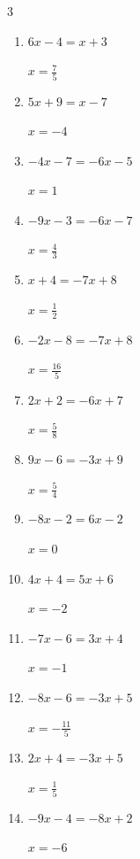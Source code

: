 \begin{multicols}{3}
\begin{enumerate}
        $\displaystyle x=\frac{5}{2}$

  \item $6x-4=x+3$

        $\displaystyle x=\frac{7}{5}$

  \item $5x+9=x-7$

        $\displaystyle x=-4$

  \item $-4x-7=-6x-5$

        $\displaystyle x=1$

  \item $-9x-3=-6x-7$

        $\displaystyle x=\frac{4}{3}$

  \item $x+4=-7x+8$

        $\displaystyle x=\frac{1}{2}$

\columnbreak %

  \item $-2x-8=-7x+8$

        $\displaystyle x=\frac{16}{5}$

  \item $2x+2=-6x+7$

        $\displaystyle x=\frac{5}{8}$

  \item $9x-6=-3x+9$

        $\displaystyle x=\frac{5}{4}$

  \item $-8x-2=6x-2$

        $\displaystyle x=0$

  \item $4x+4=5x+6$

        $\displaystyle x=-2$

  \item $-7x-6=3x+4$

        $\displaystyle x=-1$

  \item $-8x-6=-3x+5$

        $\displaystyle x=-\frac{11}{5}$

  \item $2x+4=-3x+5$

        $\displaystyle x=\frac{1}{5}$

  \item $-9x-4=-8x+2$

        $\displaystyle x=-6$


\end{enumerate}
\end{multicols}
